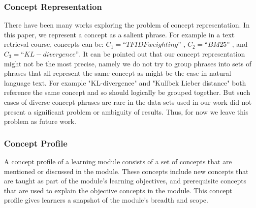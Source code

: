 \subsubsection{Concept Representation}\label{concept_rep}
There have been many works exploring the problem of concept representation. 
In this paper, we represent a concept as a salient phrase. For example in a text retrieval course, concepts can be: $C_{1} = “TFIDF weighting”$ , $C_{2} = “BM25”$ , and $C_{3}=“KL-divergence”$. It can be pointed out that our concept representation might not be the most precise, namely we do not try to group phrases into sets of phrases that all represent the same concept as might be the case in natural language text. For example "KL-divergence" and "Kullbek Lieber distance" both reference the same concept and so should logically be grouped together. But such cases of diverse concept phrases are rare in the data-sets used in our work did not present a significant problem or ambiguity
of results. Thus, for now we leave this problem as future work.
\subsubsection{Concept Profile}\label{concept_profile}
A concept profile of a learning module consists of a set of concepts that are mentioned or discussed in the module. These concepts include new concepts that are taught as part of the module's learning objectives, and prerequisite concepts that are used to explain the objective concepts in the module. This concept profile gives learners a snapshot of the module's breadth and scope. 

